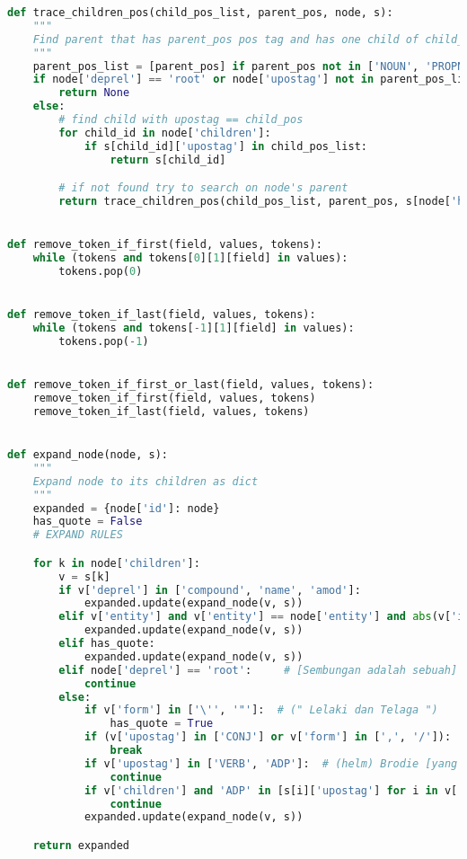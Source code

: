 \begin{lstlisting}[language=Python]
def trace_children_pos(child_pos_list, parent_pos, node, s):
    """
    Find parent that has parent_pos pos tag and has one child of child_pos
    """
    parent_pos_list = [parent_pos] if parent_pos not in ['NOUN', 'PROPN'] else ['NOUN', 'PROPN']
    if node['deprel'] == 'root' or node['upostag'] not in parent_pos_list:
        return None
    else:
        # find child with upostag == child_pos
        for child_id in node['children']:
            if s[child_id]['upostag'] in child_pos_list:
                return s[child_id]

        # if not found try to search on node's parent
        return trace_children_pos(child_pos_list, parent_pos, s[node['head']], s)


def remove_token_if_first(field, values, tokens):
    while (tokens and tokens[0][1][field] in values):
        tokens.pop(0)


def remove_token_if_last(field, values, tokens):
    while (tokens and tokens[-1][1][field] in values):
        tokens.pop(-1)


def remove_token_if_first_or_last(field, values, tokens):
    remove_token_if_first(field, values, tokens)
    remove_token_if_last(field, values, tokens)


def expand_node(node, s):
    """
    Expand node to its children as dict
    """
    expanded = {node['id']: node}
    has_quote = False
    # EXPAND RULES

    for k in node['children']:
        v = s[k]
        if v['deprel'] in ['compound', 'name', 'amod']:
            expanded.update(expand_node(v, s))
        elif v['entity'] and v['entity'] == node['entity'] and abs(v['id'] - node['id']) == 1:
            expanded.update(expand_node(v, s))
        elif has_quote:
            expanded.update(expand_node(v, s))
        elif node['deprel'] == 'root':     # [Sembungan adalah sebuah] (desa) [.]
            continue
        else:
            if v['form'] in ['\'', '"']:  # (" Lelaki dan Telaga ")
                has_quote = True
            if (v['upostag'] in ['CONJ'] or v['form'] in [',', '/']):  # (kecamatan) Kejajar [, kabupaten Wonosobo]
                break
            if v['upostag'] in ['VERB', 'ADP']:  # (helm) Brodie [yang dipakai]
                continue
            if v['children'] and 'ADP' in [s[i]['upostag'] for i in v['children']]:  # (Stahlhelm) Jerman [dengan perbaikan desain], [Beberapa bulan sebelum] (Rose)
                continue
            expanded.update(expand_node(v, s))

    return expanded



\end{lstlisting}
